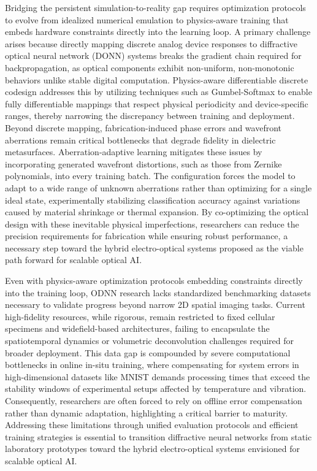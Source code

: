 Bridging the persistent simulation-to-reality gap requires optimization protocols to evolve from idealized numerical emulation to physics-aware training that embeds hardware constraints directly into the learning loop. A primary challenge arises because directly mapping discrete analog device responses to diffractive optical neural network (DONN) systems breaks the gradient chain required for backpropagation, as optical components exhibit non-uniform, non-monotonic behaviors unlike stable digital computation. Physics-aware differentiable discrete codesign addresses this by utilizing techniques such as Gumbel-Softmax to enable fully differentiable mappings that respect physical periodicity and device-specific ranges, thereby narrowing the discrepancy between training and deployment. \citep{doi_10_1145_3508352_3549378_13c53996} Beyond discrete mapping, fabrication-induced phase errors and wavefront aberrations remain critical bottlenecks that degrade fidelity in dielectric metasurfaces. Aberration-adaptive learning mitigates these issues by incorporating generated wavefront distortions, such as those from Zernike polynomials, into every training batch. \citep{s2_8560e3428b029604da9bd494e485939165b3777e_bf7326ee} The configuration forces the model to adapt to a wide range of unknown aberrations rather than optimizing for a single ideal state, experimentally stabilizing classification accuracy against variations caused by material shrinkage or thermal expansion. By co-optimizing the optical design with these inevitable physical imperfections, researchers can reduce the precision requirements for fabrication while ensuring robust performance, a necessary step toward the hybrid electro-optical systems proposed as the viable path forward for scalable optical AI. \citep{doi_10_1145_3508352_3549378_13c53996} \citep{s2_8560e3428b029604da9bd494e485939165b3777e_bf7326ee} \citep{doi_10_1063_5_0141881_93942631}

Even with physics-aware optimization protocols embedding constraints directly into the training loop, ODNN research lacks standardized benchmarking datasets necessary to validate progress beyond narrow 2D spatial imaging tasks. Current high-fidelity resources, while rigorous, remain restricted to fixed cellular specimens and widefield-based architectures, failing to encapsulate the spatiotemporal dynamics or volumetric deconvolution challenges required for broader deployment. This data gap is compounded by severe computational bottlenecks in online in-situ training, where compensating for system errors in high-dimensional datasets like MNIST demands processing times that exceed the stability windows of experimental setups affected by temperature and vibration. Consequently, researchers are often forced to rely on offline error compensation rather than dynamic adaptation, highlighting a critical barrier to maturity. Addressing these limitations through unified evaluation protocols and efficient training strategies is essential to transition diffractive neural networks from static laboratory prototypes toward the hybrid electro-optical systems envisioned for scalable optical AI. \citep{doi_10_1038_s41597_026_07467_x_ae097478} \citep{s2_dac795899d5e98d409739c3bcfe096491d6b7427_5b5c8d05}

